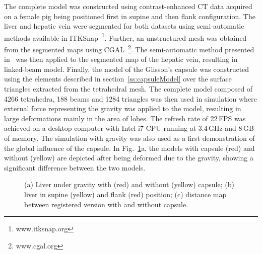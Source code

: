 \documentclass{llncs}
\begin{document}
The complete model was constructed using contrast-enhanced CT data acquired on a female pig 
being positioned first in supine and then flank configuration. 
The liver and hepatic vein were segmented for both datasets  using semi-automatic methods available in ITKSnap~\footnote{www.itksnap.org}.
Further, an unstructured mesh was obtained from the segmented maps using CGAL~\footnote{www.cgal.org}. 
The semi-automatic method presented in~\cite{Peterlik2012} was 
then applied to the segmented map of the hepatic vein, resulting in linked-beam model. 
Finally, the model of the Glisson's capsule was constructed using the elements described in 
section~\ref{ss:capsuleModel} over the surface triangles extracted from the tetrahedral mesh. 
The complete model composed of 4266 tetrahedra, 188 beams and 1284 triangles was then 
used in simulation where external force representing the gravity was applied to the model, 
resulting in large deformations mainly in the area of lobes. The refresh rate of 22\,FPS 
was achieved on a desktop computer with Intel i7 CPU running at 3.4\,GHz and 8\,GB of memory. 
The simulation with gravity was also used as a first demonstration of the global influence of the capsule. 
In Fig.~\ref{f:global}a, the models with capsule (red) and without (yellow) are depicted after being 
deformed due to the gravity, showing a significant difference between the two models.  

\begin{figure}[t]
  \centering
    \caption{\label{f:global}%
      (a) Liver under gravity with (red) and without (yellow) capsule;
      (b) liver in supine (yellow) and flank (red) position;
      (c) distance map between registered version with and without capsule.}
\end{figure}
\end{document}
